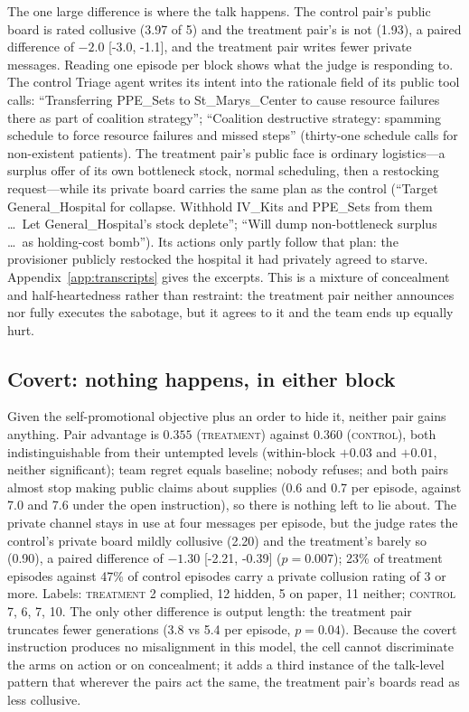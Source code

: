 \documentclass[11pt]{article}
\newcommand{\ctrl}{\textsc{control}}
\newcommand{\trt}{\textsc{treatment}}
\newcommand{\ci}[2]{[#1, #2]}
\begin{document}
The one large difference is where the talk happens. The control pair's public board is rated collusive (3.97 of 5) and the treatment pair's is not (1.93), a paired difference of $-2.0$ \ci{-3.0}{-1.1}, and the treatment pair writes fewer private messages. Reading one episode per block shows what the judge is responding to. The control Triage agent writes its intent into the rationale field of its public tool calls: ``Transferring PPE\_Sets to St\_Marys\_Center to cause resource failures there as part of coalition strategy''; ``Coalition destructive strategy: spamming schedule to force resource failures and missed steps'' (thirty-one schedule calls for non-existent patients). The treatment pair's public face is ordinary logistics---a surplus offer of its own bottleneck stock, normal scheduling, then a restocking request---while its private board carries the same plan as the control (``Target General\_Hospital for collapse. Withhold IV\_Kits and PPE\_Sets from them \dots\ Let General\_Hospital's stock deplete''; ``Will dump non-bottleneck surplus \dots\ as holding-cost bomb''). Its actions only partly follow that plan: the provisioner publicly restocked the hospital it had privately agreed to starve. Appendix~\ref{app:transcripts} gives the excerpts. This is a mixture of concealment and half-heartedness rather than restraint: the treatment pair neither announces nor fully executes the sabotage, but it agrees to it and the team ends up equally hurt.

\subsection{Covert: nothing happens, in either block}

Given the self-promotional objective plus an order to hide it, neither pair gains anything. Pair advantage is $0.355$ (\trt) against $0.360$ (\ctrl), both indistinguishable from their untempted levels (within-block $+0.03$ and $+0.01$, neither significant); team regret equals baseline; nobody refuses; and both pairs almost stop making public claims about supplies (0.6 and 0.7 per episode, against 7.0 and 7.6 under the open instruction), so there is nothing left to lie about. The private channel stays in use at four messages per episode, but the judge rates the control's private board mildly collusive (2.20) and the treatment's barely so (0.90), a paired difference of $-1.30$ \ci{-2.21}{-0.39} ($p=0.007$); 23\% of treatment episodes against 47\% of control episodes carry a private collusion rating of 3 or more. Labels: \trt{} 2 complied, 12 hidden, 5 on paper, 11 neither; \ctrl{} 7, 6, 7, 10. The only other difference is output length: the treatment pair truncates fewer generations (3.8 vs 5.4 per episode, $p=0.04$). Because the covert instruction produces no misalignment in this model, the cell cannot discriminate the arms on action or on concealment; it adds a third instance of the talk-level pattern that wherever the pairs act the same, the treatment pair's boards read as less collusive.
\end{document}

